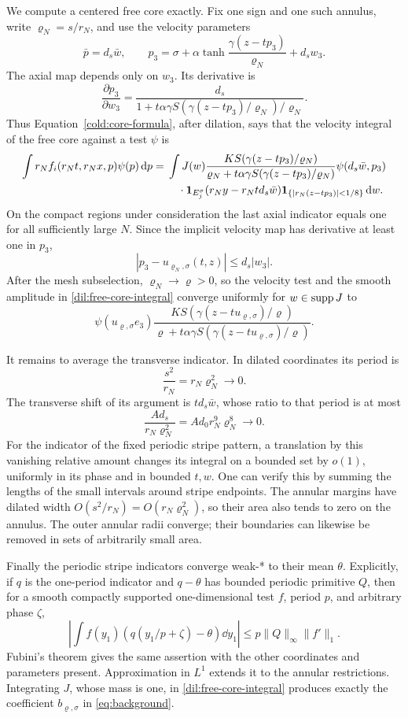 We compute a centered free core exactly. Fix one sign and one such annulus,
write \(\varrho_N=s/r_N\), and use the velocity parameters
\[
\bar p=d_s\bar w,\qquad
p_3=\sigma+\alpha\tanh\frac{\gamma(z-tp_3)}{\varrho_N}+d_sw_3.
\]
The axial map depends only on \(w_3\). Its derivative is
\[
\frac{\partial p_3}{\partial w_3}
=\frac{d_s}
 {1+t\alpha\gamma S(\gamma(z-tp_3)/\varrho_N)/\varrho_N}.
\]
Thus Equation~\eqref{cold:core-formula}, after dilation, says that the
velocity integral of the free core against a test \(\psi\) is
\begin{equation}\label{dil:free-core-integral}
\begin{split}
\int r_N f_i(r_Nt,r_Nx,p)\psi(p)\,\mathrm d p
={}&\int J(w)
 \frac{K S(\gamma(z-tp_3)/\varrho_N)}
      {\varrho_N+t\alpha\gamma S(\gamma(z-tp_3)/\varrho_N)}
 \psi(d_s\bar w,p_3)\\
&\quad\cdot\mathbf 1_{E_j^\sigma}(r_Ny-r_Ntd_s\bar w)
 \mathbf 1_{\{|r_N(z-tp_3)|<1/8\}}\,\mathrm d w.
\end{split}
\end{equation}
On the compact regions under consideration the last axial indicator
equals one for all sufficiently large \(N\). Since the implicit
velocity map has derivative at least one in \(p_3\),
\[
|p_3-u_{\varrho_N,\sigma}(t,z)|\leq d_s|w_3|.
\]
After the mesh subselection, \(\varrho_N\to\varrho>0\), so the velocity
test and the smooth amplitude in \eqref{dil:free-core-integral}
converge uniformly for \(w\in\operatorname{supp} J\) to
\[
\psi(u_{\varrho,\sigma}e_3)
\frac{K S(\gamma(z-tu_{\varrho,\sigma})/\varrho)}
 {\varrho+t\alpha\gamma S(\gamma(z-tu_{\varrho,\sigma})/\varrho)}.
\]

It remains to average the transverse indicator. In dilated coordinates
its period is
\[
\frac{s^2}{r_N}=r_N\varrho_N^2\longrightarrow0.
\]
The transverse shift of its argument is \(td_s\bar w\), whose ratio
to that period is at most
\[
\frac{Ad_s}{r_N\varrho_N^2}=A d_0 r_N^9\varrho_N^8\longrightarrow0.
\]
For the indicator of the fixed periodic stripe pattern, a translation
by this vanishing relative amount changes its integral on a bounded
set by \(o(1)\), uniformly in its phase and in bounded \(t,w\).
One can verify this by summing the lengths of the small intervals
around stripe endpoints. The annular margins have dilated width
\(O(s^2/r_N)=O(r_N\varrho_N^2)\), so their area also tends to zero on
the annulus. The outer annular radii converge; their boundaries can
likewise be removed in sets of arbitrarily small area.

Finally the periodic stripe indicators converge weak-* to their mean
\(\theta\). Explicitly, if \(q\) is the one-period indicator and
\(q-\theta\) has bounded periodic primitive \(Q\), then for a smooth
compactly supported one-dimensional test \(f\), period \(p\), and
arbitrary phase \(\zeta\),
\[
\left|\int f(y_1)(q(y_1/p+\zeta)-\theta)\dd y_1\right|
\leq p\|Q\|_\infty\|f'\|_1.
\]
Fubini's theorem gives the same assertion with the other coordinates
and parameters present. Approximation in \(L^1\) extends it to the
annular restrictions. Integrating \(J\), whose mass is one, in
\eqref{dil:free-core-integral} produces exactly the coefficient
\(b_{\varrho,\sigma}\) in \eqref{eq:background}.

